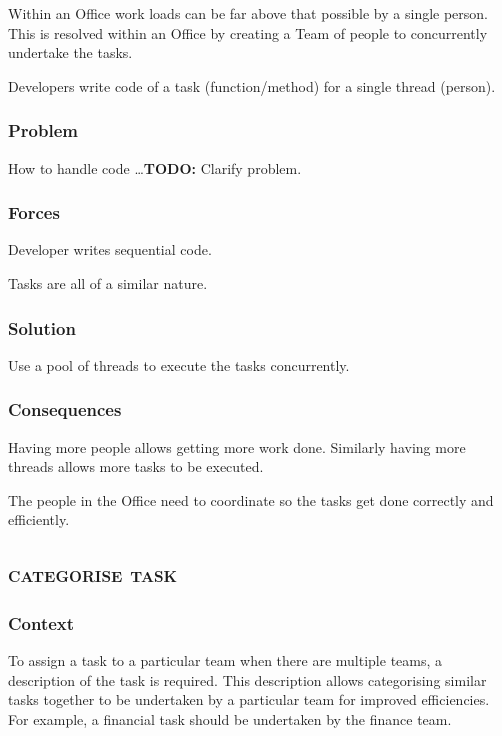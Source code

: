 \documentclass[prodmode]{style/acmlarge}
\begin{document}
Within an Office work loads can be far above that possible by a single person. 
This is resolved within an Office by creating a Team of people to concurrently
undertake the tasks.

Developers write code of a task (function/method) for a single thread (person).

\subsubsection*{Problem}

How to handle code \ldots  \textbf{TODO:} Clarify problem.

\subsubsection*{Forces}

Developer writes sequential code.

Tasks are all of a similar nature.  

\subsubsection*{Solution}

Use a pool of threads to execute the tasks concurrently.

\subsubsection*{Consequences} 

Having more people allows getting more work done.
Similarly having more threads allows more tasks to be executed.

The people in the Office need to coordinate so the tasks get done correctly and
efficiently.



\subsection{\textsc{\textbf{categorise task}}}

\subsubsection*{Context}

To assign a task to a particular team when there are multiple teams, a
description of the task is required.  This description allows categorising
similar tasks together to be undertaken by a particular team for improved
efficiencies.  For example, a financial task should be undertaken by the
finance team.
\end{document}
